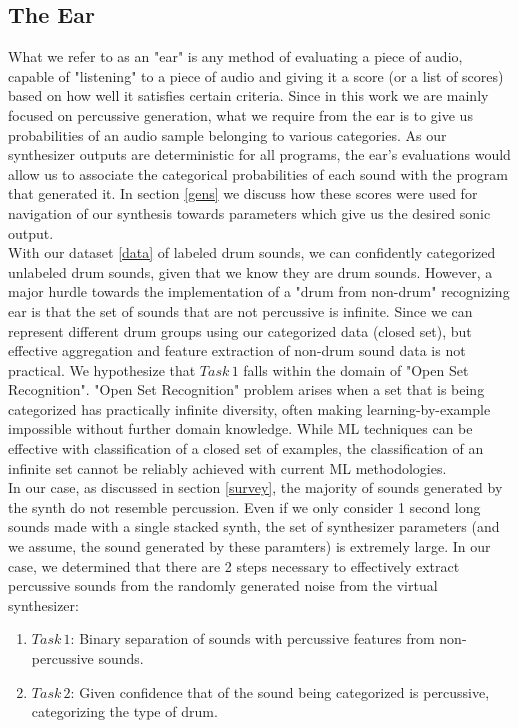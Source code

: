 \documentclass{nime-alternate} %
\begin{document}
\subsection{The Ear}
What we refer to as an "ear" is any method of evaluating a piece of audio, capable of "listening" to a piece of audio and giving it a score (or a list of scores) based on how well it satisfies certain criteria. Since in this work we are mainly focused on percussive generation, what we require from the ear is to give us probabilities of an audio sample belonging to various categories. As our synthesizer outputs are deterministic for all programs, the ear's evaluations would allow us to associate the categorical probabilities of each sound with the program that generated it. In section \ref{gens} we discuss how these scores were used for navigation of our synthesis towards parameters which give us the desired sonic output.\\
 With our dataset \ref{data} of labeled drum sounds, we can confidently categorized unlabeled drum sounds, given that we know they are drum sounds. However, a major hurdle towards the implementation of a "drum from non-drum" recognizing ear is that the set of sounds that are not percussive is infinite. Since we can represent different drum groups using our categorized data (closed set), but effective aggregation and feature extraction of non-drum sound data is not practical. We hypothesize that $Task\,1$ falls within the domain of "Open Set Recognition"\cite{scheirer2012toward}. "Open Set Recognition" problem arises when a set that is being categorized has practically infinite diversity, often making learning-by-example impossible without further domain knowledge. While ML techniques can be effective with classification of a closed set of examples, the classification of an infinite set cannot be reliably achieved with current ML methodologies\cite{geng2018recent,mundt2019open}. \\
  In our case, as discussed in section \ref{survey}, the majority of sounds generated by the synth do not resemble percussion. Even if we only consider 1 second long sounds made with a single stacked synth, the set of synthesizer parameters (and we assume, the sound generated by these paramters) is extremely large. In our case, we determined that there are 2 steps necessary to effectively extract percussive sounds from the randomly generated noise from the virtual synthesizer: 
  \begin{enumerate}
   \item  $Task\,1$: Binary separation of sounds with percussive features from non-percussive sounds.
   \item $Task\,2$: Given confidence that of the sound being categorized is percussive, categorizing the type of drum.
 \end{enumerate}
\end{document}
